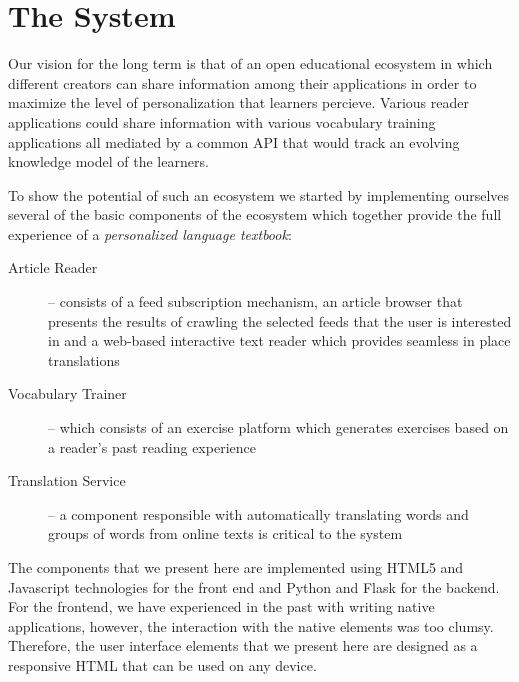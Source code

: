 
\newpage
\section{The System}
\label{sec:system}

Our vision for the long term is that of an open educational ecosystem in which different creators can share information among their applications in order to maximize the level of personalization that learners percieve. Various reader applications could share information with various vocabulary training applications all mediated by a common API that would track an evolving knowledge model of the learners\cite{Lungu16}.


To show the potential of such an ecosystem we started by implementing ourselves several of the basic components of the ecosystem which together provide the full experience of a {\em personalized language textbook}: 

\begin{description}

  \item [Article Reader] -- consists of a feed subscription mechanism, an article browser that presents the results of crawling the selected feeds that the user is interested in and a web-based interactive text reader which provides seamless in place translations
  
  \item [Vocabulary Trainer] -- which consists of an exercise platform which generates exercises based on a reader's past reading experience

  \item [Translation Service] -- a component responsible with automatically translating words and groups of words from online texts is critical to the system

\end{description}


The components that we present here are implemented using HTML5 and Javascript technologies for the front end and Python and Flask for the backend. For the frontend, we have experienced in the past with writing native applications, however, the interaction with the native elements was too clumsy. Therefore, the user interface elements that we present here are designed as a responsive HTML that can be used on any device. 

